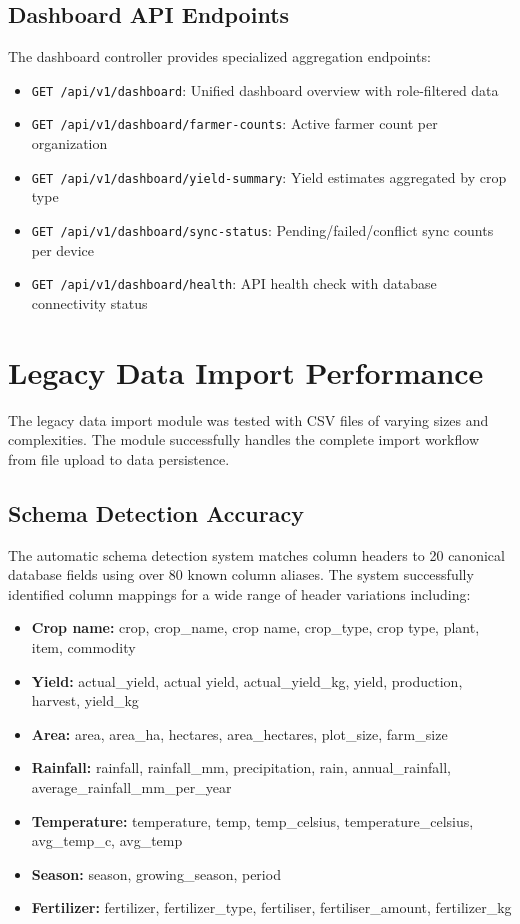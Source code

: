 \subsection{Dashboard API Endpoints}

The dashboard controller provides specialized aggregation endpoints:

\begin{itemize}
  \item \texttt{GET /api/v1/dashboard}: Unified dashboard overview with role-filtered data
  \item \texttt{GET /api/v1/dashboard/farmer-counts}: Active farmer count per organization
  \item \texttt{GET /api/v1/dashboard/yield-summary}: Yield estimates aggregated by crop type
  \item \texttt{GET /api/v1/dashboard/sync-status}: Pending/failed/conflict sync counts per device
  \item \texttt{GET /api/v1/dashboard/health}: API health check with database connectivity status
\end{itemize}

\section{Legacy Data Import Performance}

The legacy data import module was tested with CSV files of varying sizes and complexities. The module successfully handles the complete import workflow from file upload to data persistence.

\subsection{Schema Detection Accuracy}

The automatic schema detection system matches column headers to 20 canonical database fields using over 80 known column aliases. The system successfully identified column mappings for a wide range of header variations including:

\begin{itemize}
  \item \textbf{Crop name:} crop, crop\_name, crop name, crop\_type, crop type, plant, item, commodity
  \item \textbf{Yield:} actual\_yield, actual yield, actual\_yield\_kg, yield, production, harvest, yield\_kg
  \item \textbf{Area:} area, area\_ha, hectares, area\_hectares, plot\_size, farm\_size
  \item \textbf{Rainfall:} rainfall, rainfall\_mm, precipitation, rain, annual\_rainfall, average\_rainfall\_mm\_per\_year
  \item \textbf{Temperature:} temperature, temp, temp\_celsius, temperature\_celsius, avg\_temp\_c, avg\_temp
  \item \textbf{Season:} season, growing\_season, period
  \item \textbf{Fertilizer:} fertilizer, fertilizer\_type, fertiliser, fertiliser\_amount, fertilizer\_kg
\end{itemize}

